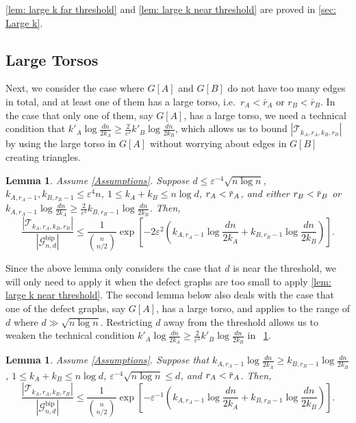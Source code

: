 \documentclass[11pt]{article}
\newcommand{\eps}{\varepsilon}
\newcommand{\overbar}[1]{\mkern 1.5mu\overline{\mkern-1.5mu#1\mkern-1.5mu}\mkern 1.5mu}
\theoremstyle{plain}
\newtheorem{lem}[thm]{Lemma}
\begin{document}
\cref{lem: large k far threshold} and \cref{lem: large k near threshold} are proved in \cref{sec: Large k}.




\subsection{Large Torsos}
Next, we consider the case where $G[A]$ and $G[B]$ do not have too many edges in total, and at least one of them has a large torso, i.e.\ $r_A<\bar r_A$ or $r_B<\bar r_B$. In the case that only one of them, say $G[A]$, has a large torso, we need a technical condition that
$k'_A\log\frac{dn}{2k_A} \geq \frac{2}{\varepsilon^2}k'_B\log\frac{dn}{2k_B}$, which allows us to bound $|\mathcal T_{k_A, r_A,k_B, r_B}|$ by using the large torso in $G[A]$ without worrying about edges in $G[B]$ creating triangles.

\newtheorem*{lem: Janson Counting 1}{Lemma \ref{lem: Janson Counting 1}}
\begin{lem}\label{lem: Janson Counting 1}
    Assume \eqref{Assumptions}. Suppose $d \leq \eps^{-4}\sqrt{n \log n}$, $k_{A, r_A -1},  k_{B, r_B - 1} \leq \eps^4 n$, $1 \leq k_A + k_B \leq n \log d$, $r_A < \overbar{r}_{A}$, and either $r_B < \overbar{r}_{B}$ or $k_{A, r_A -1}\log\frac{dn}{2k_A} \geq \frac{2}{\varepsilon^2}k_{B, r_B -1}\log\frac{dn}{2k_B}$. Then,
    \[
    \frac{|\mathcal T_{k_A, r_A,k_B, r_B}|}{|\mathcal G^{\text{bip}}_{n,d}|} \leq \frac{1}{\binom{n}{n/2}} \exp\left[-2\varepsilon^2\left(k_{A, r_A -1}\log\frac{dn}{2k_A} + k_{B, r_B -1}\log\frac{dn}{2k_B}\right)\right].
    \]
\end{lem}

Since the above lemma only considers the case that $d$ is near the threshold, we will only need to apply it when the defect graphs are too small to apply \cref{lem: large k near threshold}. The second lemma below also deals with the case that one of the defect graphs, say $G[A]$, has a large torso, and applies to the range of $d$ where $d\gg \sqrt{n\log n}$. Restricting $d$ away from the threshold allows us to weaken the technical condition $k'_A\log\frac{dn}{2k_A} \geq \frac{2}{\varepsilon^2}k'_B\log\frac{dn}{2k_B}$ in ~\cref{lem: Janson Counting 1}.

\newtheorem*{lem: Janson Counting 2}{Lemma \ref{lem: Janson Counting 2}}
\begin{lem}\label{lem: Janson Counting 2}
    Assume \eqref{Assumptions}. Suppose that $k_{A, r_A - 1} \log\frac{dn}{2k_A} \geq k_{B, r_B - 1}\log\frac{dn}{2k_B}$, $1 \leq k_A + k_B \leq n \log d$, $\varepsilon^{-4}\sqrt{n\log n} \leq d$, and $r_A < \overbar{r}_{A}$. Then,
    \[
    \frac{|\mathcal T_{k_A, r_A ,k_B, r_B}|}{|\mathcal G^{\text{bip}}_{n,d}|} \leq \frac{1}{\binom{n}{n/2}}\exp\left[-{\varepsilon^{-1}}\left(k_{A, r_A - 1} \log\frac{dn}{2k_A} + k_{B, r_B - 1}\log\frac{dn}{2k_B}\right)\right].
    \]
\end{lem}
\end{document}
